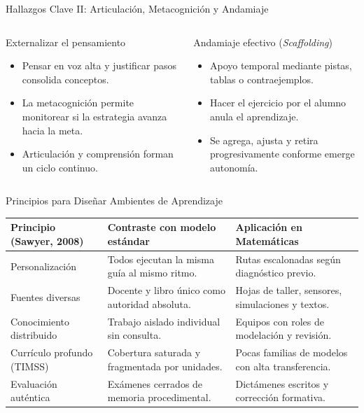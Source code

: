 \documentclass[aspectratio=169,spanish,xcolor=table]{beamer}
\begin{document}
\begin{frame}{Hallazgos Clave II: Articulación, Metacognición y Andamiaje}
  \begin{columns}[T]
      \begin{block}{Externalizar el pensamiento}
        \begin{itemize}\small
          \item Pensar en voz alta y justificar pasos consolida conceptos.
          \item La metacognición permite monitorear si la estrategia avanza hacia la meta.
          \item Articulación y comprensión forman un ciclo continuo.
        \end{itemize}
      \end{block}
      \begin{block}{Andamiaje efectivo (\textit{Scaffolding})}
        \begin{itemize}\small
          \item Apoyo temporal mediante pistas, tablas o contraejemplos.
          \item Hacer el ejercicio por el alumno anula el aprendizaje.
          \item Se agrega, ajusta y retira progresivamente conforme emerge autonomía.
        \end{itemize}
      \end{block}
  \end{columns}
\end{frame}

\begin{frame}{Principios para Diseñar Ambientes de Aprendizaje}
  \renewcommand{\arraystretch}{1.28}
  \scriptsize
  \begin{tabular}{p{3.4cm}p{5.2cm}p{4.8cm}}
    \toprule
    \textbf{Principio (Sawyer, 2008)} & \textbf{Contraste con modelo estándar} & \textbf{Aplicación en Matemáticas} \\
    \midrule
    Personalización & Todos ejecutan la misma guía al mismo ritmo. & Rutas escalonadas según diagnóstico previo. \\
    Fuentes diversas & Docente y libro único como autoridad absoluta. & Hojas de taller, sensores, simulaciones y textos. \\
    Conocimiento distribuido & Trabajo aislado individual sin consulta. & Equipos con roles de modelación y revisión. \\
    Currículo profundo (TIMSS) & Cobertura saturada y fragmentada por unidades. & Pocas familias de modelos con alta transferencia. \\
    Evaluación auténtica & Exámenes cerrados de memoria procedimental. & Dictámenes escritos y corrección formativa. \\
    \bottomrule
  \end{tabular}
\end{frame}
\end{document}
